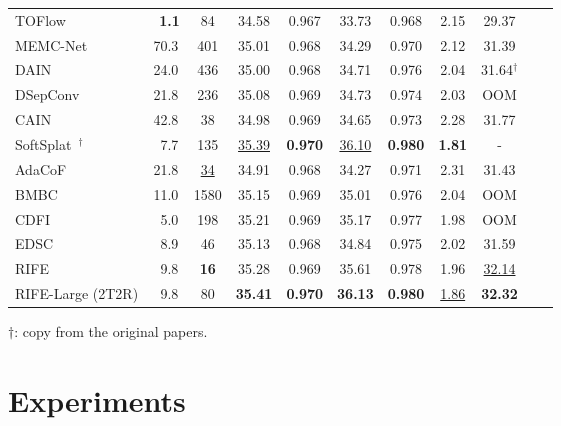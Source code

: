 \documentclass[final]{cvpr}
\def\red#1{\textcolor{MyRed}{#1}}
\def\blue#1{\textcolor{MyBlue}{#1}}
\def\first#1{\red{\textbf{#1}}}
\def\second#1{\blue{\underline{#1}}}
\begin{document}
\begin{table*}
\begin{tabular}{lcccccccccc}
		TOFlow~\cite{baker2011database} &~\first{1.1} &84 & 34.58 & 0.967  &33.73& 0.968 &2.15 &29.37  \\
		
\rowcolor{mygray} MEMC-Net~\cite{bao2019memc} & 70.3 & 401 & {35.01} & {0.968} &{34.29}& {0.970}  &{2.12} & 31.39  \\ 

		 \rowcolor{mygray}DAIN~\cite{bao2019depth} & 24.0 & 436 & {35.00} & {0.968} &{34.71}& {0.976}  &2.04 & 31.64$^{\dag}$\\ 

		DSepConv~\cite{cheng2020video} & 21.8 & 236 & 35.08 & 0.969 & 34.73 & 0.974 & 2.03 & OOM\\
		
		CAIN~\cite{choi2020channel} & 42.8 & 38 & 34.98 & {0.969} & 34.65 & 0.973 & 2.28 & 31.77\\
		
		\rowcolor{mygray} SoftSplat~\cite{niklaus2020softmax}$^{\dag}$ & ~7.7 & 135 & \second{35.39} & \first{0.970} & \second{36.10} & \first{0.980} & \first{1.81} & - \\
		
		AdaCoF~\cite{lee2020adacof} & 21.8 & \second{34} & 34.91 & 0.968 & 34.27 & 0.971 & 2.31 & 31.43 \\ 
		
		BMBC~\cite{park2020bmbc} & 11.0 & 1580 & 35.15 & {0.969} & 35.01 & 0.976 & 2.04 & OOM\\
		
		CDFI~\cite{ding2021cdfi} & ~5.0 & 198 & 35.21 & 0.969 &35.17 & 0.977 & 1.98 & OOM\\
		EDSC~\cite{cheng2020multiple} & {~8.9} & 46 & 35.13 & 0.968 & 34.84 & 0.975 & 2.02 & 31.59
		
		\\\hline \hline
		
		RIFE & {~9.8} & \first{16} & 35.28 & {0.969} & 35.61 & {0.978} & 1.96 & \second{32.14}\\
		
		RIFE-Large (2T2R) & {~9.8} & 80 & \first{35.41} & \first{0.970} & \first{36.13} & \first{0.980} & \second{1.86} & \first{32.32}
		\\
		\bottomrule
	\end{tabular} 
	\label{tab:comparison}
	\begin{tablenotes}
		\raggedleft
		\item{
   
$\dag$: copy from the original papers.
    
	}
	\end{tablenotes}
	\label{tab:UCF101_Vimeo90K_MB}
	\vspace{-1em}
\end{table*} \section{Experiments}
\end{document}
